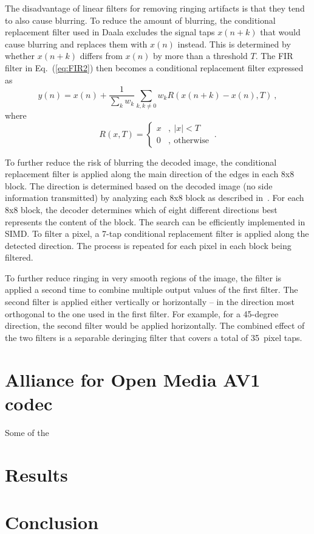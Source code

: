 \documentclass[english,conference,10pt]{IEEEtran}
\begin{document}
The disadvantage of linear filters for removing ringing artifacts
is that they tend to also cause blurring. To reduce the amount of
blurring, the conditional replacement filter used in Daala excludes
the signal taps $x\left(n+k\right)$ that would cause blurring and
replaces them with $x\left(n\right)$ instead. This is determined
by whether $x\left(n+k\right)$ differs from $x\left(n\right)$ by
more than a threshold $T$. The FIR filter in Eq.~(\ref{eq:FIR2})
then becomes a conditional replacement filter expressed as
\begin{equation}
y\left(n\right)=x\left(n\right)+\frac{1}{\sum_{k}w_{k}}\sum_{k,k\neq0}w_{k}R\left(x\left(n+k\right)-x\left(n\right),T\right)\ ,\label{eq:CRF}
\end{equation}
where
\begin{equation}
R\left(x,T\right)=\left\{ \begin{array}{ll}
x & ,\ \left|x\right|<T\\
0 & ,\ \mathrm{otherwise}
\end{array}\right.\ .
\end{equation}

To further reduce the risk of blurring the decoded image, the conditional
replacement filter is applied along the main direction of the edges
in each 8x8 block. The direction is determined based on the decoded image
(no side information transmitted) by analyzing each 8x8 block as described
in~\cite{ValinDeringing}. For each 8x8 block, the decoder determines which
of eight different directions best represents the content of the block.
The search can be efficiently implemented in SIMD. To filter a pixel, a 7-tap
conditional replacement filter is applied along the detected direction.
The process is repeated for each pixel in each block being filtered.

To further reduce ringing in very smooth regions of the image, the filter
is applied a second time to combine multiple output values of the
first filter. The second filter is applied either vertically or horizontally
-- in the direction most orthogonal to the one used in the first filter.
For example, for a 45-degree direction, the second filter would be
applied horizontally. The combined effect of the two filters is a separable
deringing filter that covers a total of 35~pixel taps.


\section{Alliance for Open Media AV1 codec}
\label{sec:AOM}

Some of the

\section{Results}
\label{sec:Results}


\section{Conclusion}



\end{document}
